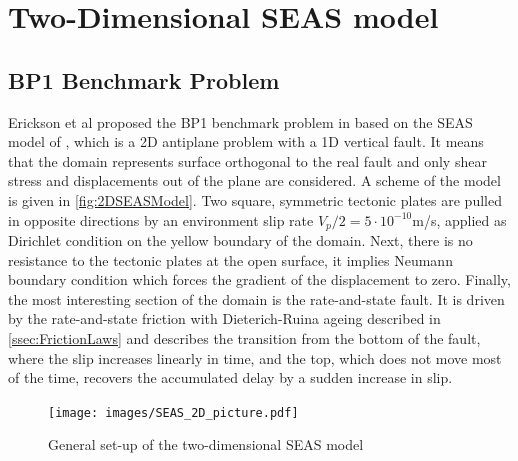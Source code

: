\chapter{Two-Dimensional SEAS model}
\label{chap:2DSEAS}

\section{BP1 Benchmark Problem}
Erickson et al proposed the BP1 benchmark problem in \cite{BP1-Benchmark} based on the SEAS model of \cite{GeneralSEASSimulations}, which is a 2D antiplane problem with a 1D vertical fault. It means that the domain represents surface orthogonal to the real fault and only shear stress and displacements out of the plane are considered. A scheme of the model is given in \autoref{fig:2DSEASModel}. Two square, symmetric tectonic plates are pulled in opposite directions by an environment slip rate $V_p/2=5\cdot10^{-10}$m/s, applied as Dirichlet condition on the yellow boundary of the domain. Next, there is no resistance to the tectonic plates at the open surface, it implies Neumann boundary condition which forces the gradient of the displacement to zero. Finally, the most interesting section of the domain is the rate-and-state fault. It is driven by the rate-and-state friction with Dieterich-Ruina ageing described in \autoref{ssec:FrictionLaws} and describes the transition from the bottom of the fault, where the slip increases linearly in time, and the top, which does not move most of the time, recovers the accumulated delay by a sudden increase in slip. \\

\begin{figure}[H]
	\centering
	\texttt{[image: images/SEAS\_2D\_picture.pdf]}
	\caption{General set-up of the two-dimensional SEAS model}
	\label{fig:2DSEASModel}
\end{figure}

